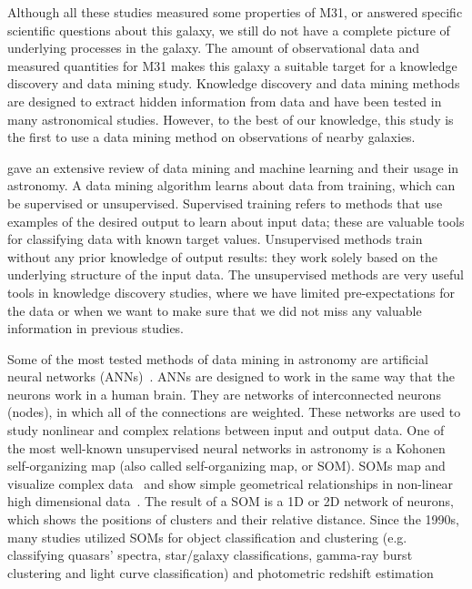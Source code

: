 Although all these studies measured some properties of M31, or answered specific scientific questions about this galaxy, we still do not have a complete picture of underlying processes in the galaxy.
The amount of observational data and measured quantities for M31 makes this galaxy a suitable target for a knowledge discovery and data mining study.
Knowledge discovery and data mining methods are designed to extract hidden information from data and have been tested in many astronomical studies.
However, to the best of our knowledge, this study is the first to use a data mining method on observations of nearby galaxies.

\cite{Ball10} gave an extensive review of data mining and machine learning and their usage in astronomy.
A data mining algorithm learns about data from training, which can be supervised or unsupervised.
Supervised training refers to methods that use examples of the desired output to learn about input data; these are valuable tools for classifying data with known target values.
Unsupervised methods train without any prior knowledge of output results: 
they work solely based on the underlying structure of the input data.   
The unsupervised methods are very useful tools in knowledge discovery studies, where we have limited pre-expectations for the data or when we want to make sure that we did not miss any valuable information in  previous studies.

Some of the most tested methods of data mining in astronomy are artificial neural networks (ANNs)~\citep[e.g.][and references therein]{ Hossein14,Hossein16}.
ANNs are designed to work in the same way that the neurons work in a human brain.
They are networks of interconnected neurons (nodes), in which all of the connections are weighted.
These networks are used to study nonlinear and complex relations between input and output data.
One of the most well-known unsupervised neural networks in astronomy is a Kohonen self-organizing map (also called self-organizing map, or SOM).
SOMs map and visualize complex data~\citep{Kohonen82} and show simple geometrical relationships in non-linear high dimensional data~\citep{Kohonen98}.
The result of a SOM is a 1D or 2D network of neurons, which shows the positions of clusters and their relative distance.
Since the 1990s, many studies utilized SOMs for object classification and clustering (e.g. classifying quasars' spectra, star/galaxy classifications, gamma-ray burst clustering and light curve classification) and photometric redshift estimation~\citep[e.g.][]{Odewahn92, Hernandez94, Murtagh95, Maehoenen95,Scaringi09,Geach12,Fustes13,Meusinger16,Rahmani16b} %

